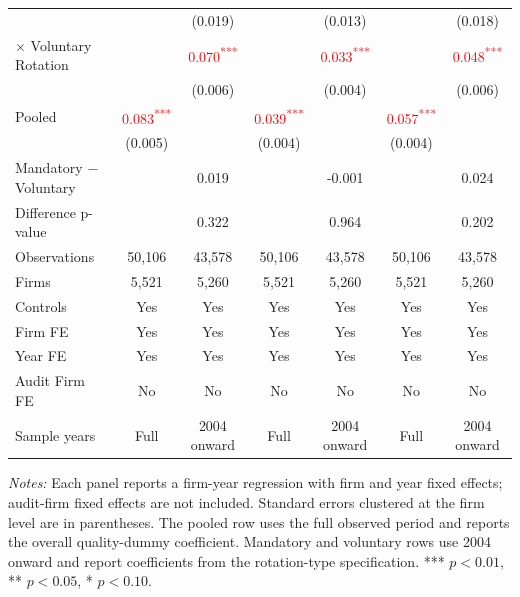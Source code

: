 \documentclass[10pt]{article}
\newcommand{\sym}[1]{\textsuperscript{#1}}
\begin{document}
\begin{minipage}{19cm}
\begin{threeparttable}
\begin{tabular}{l cc cc cc}
 &  & (0.019) &  & (0.013) &  & (0.018) \\
$\times$ Voluntary Rotation &  & \textcolor{red}{0.070\sym{***}} &  & \textcolor{red}{0.033\sym{***}} &  & \textcolor{red}{0.048\sym{***}} \\
 &  & (0.006) &  & (0.004) &  & (0.006) \\
Pooled & \textcolor{red}{0.083\sym{***}} &  & \textcolor{red}{0.039\sym{***}} &  & \textcolor{red}{0.057\sym{***}} &  \\
 & (0.005) &  & (0.004) &  & (0.004) &  \\
Mandatory $-$ Voluntary &  & 0.019 &  & -0.001 &  & 0.024 \\
Difference p-value &  & 0.322 &  & 0.964 &  & 0.202 \\
Observations & 50,106 & 43,578 & 50,106 & 43,578 & 50,106 & 43,578 \\
Firms & 5,521 & 5,260 & 5,521 & 5,260 & 5,521 & 5,260 \\
\midrule
Controls & Yes & Yes & Yes & Yes & Yes & Yes \\
Firm FE & Yes & Yes & Yes & Yes & Yes & Yes \\
Year FE & Yes & Yes & Yes & Yes & Yes & Yes \\
Audit Firm FE & No & No & No & No & No & No \\
Sample years & Full & 2004 onward & Full & 2004 onward & Full & 2004 onward \\
\bottomrule
\end{tabular}
\begin{tablenotes}\fontsize{9}{11}\selectfont
\item \fontsize{9}{11}\selectfont \textit{Notes:} Each panel reports a firm-year regression with firm and year fixed effects; audit-firm fixed effects are not included. Standard errors clustered at the firm level are in parentheses. The pooled row uses the full observed period and reports the overall quality-dummy coefficient. Mandatory and voluntary rows use 2004 onward and report coefficients from the rotation-type specification. *** \(p<0.01\), ** \(p<0.05\), * \(p<0.10\).
\end{tablenotes}
\end{threeparttable}

\end{minipage}
\end{document}
